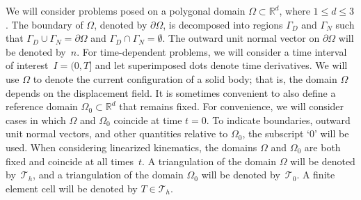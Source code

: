 We will consider problems posed on a polygonal domain $\Omega \subset
\mathbb{R}^{d}$, where $1 \le d \le 3$. The boundary of $\Omega$,
denoted by $\partial \Omega$, is decomposed into regions $\Gamma_{D}$
and $\Gamma_{N}$ such that $\Gamma_{D} \cup \Gamma_{N} = \partial \Omega$
and $\Gamma_{D} \cap \Gamma_{N} = \emptyset$.  The outward unit normal
vector on $\partial \Omega$ will be denoted by~$n$.  For time-dependent
problems, we will consider a time interval of interest~$I = (0, T]$
and let superimposed dots denote time derivatives.  We will use $\Omega$
to denote the current configuration of a solid body; that is, the domain
$\Omega$ depends on the displacement field. It is sometimes convenient
to also define a reference domain $\Omega_{0} \subset \mathbb{R}^{d}$
that remains fixed.  For convenience, we will consider cases in which
$\Omega$ and $\Omega_{0}$ coincide at time $t = 0$.  To indicate
boundaries, outward unit normal vectors, and other quantities relative
to $\Omega_{0}$, the subscript `$0$' will be used.  When considering
linearized kinematics, the domains $\Omega$ and $\Omega_{0}$ are both
fixed and coincide at all times~$t$.  A triangulation of the domain
$\Omega$ will be denoted by~$\mathcal{T}_h$, and a triangulation of the
domain $\Omega_{0}$ will be denoted by~$\mathcal{T}_{0}$.  A finite
element cell will be denoted by $T \in \mathcal{T}_h$.


